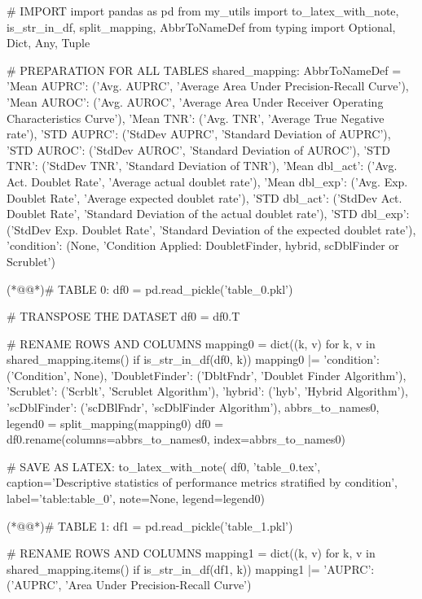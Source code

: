\documentclass[11pt]{article}
\begin{document}
\begin{python}

# IMPORT
import pandas as pd
from my_utils import to_latex_with_note, is_str_in_df, split_mapping, AbbrToNameDef
from typing import Optional, Dict, Any, Tuple 

# PREPARATION FOR ALL TABLES
shared_mapping: AbbrToNameDef = {
    'Mean AUPRC': ('Avg. AUPRC', 'Average Area Under Precision-Recall Curve'),
    'Mean AUROC': ('Avg. AUROC', 'Average Area Under Receiver Operating Characteristics Curve'),
    'Mean TNR': ('Avg. TNR', 'Average True Negative rate'),
    'STD AUPRC': ('StdDev AUPRC', 'Standard Deviation of AUPRC'),
    'STD AUROC': ('StdDev AUROC', 'Standard Deviation of AUROC'),
    'STD TNR': ('StdDev TNR', 'Standard Deviation of TNR'),
    'Mean dbl_act': ('Avg. Act. Doublet Rate', 'Average actual doublet rate'),
    'Mean dbl_exp': ('Avg. Exp. Doublet Rate', 'Average expected doublet rate'),
    'STD dbl_act': ('StdDev Act. Doublet Rate', 'Standard Deviation of the actual doublet rate'),
    'STD dbl_exp': ('StdDev Exp. Doublet Rate', 'Standard Deviation of the expected doublet rate'),
    'condition': (None, 'Condition Applied: DoubletFinder, hybrid, scDblFinder or Scrublet')
}

(*@@*)# TABLE 0:
df0 = pd.read_pickle('table_0.pkl')

# TRANSPOSE THE DATASET
df0 = df0.T

# RENAME ROWS AND COLUMNS
mapping0 = dict((k, v) for k, v in shared_mapping.items() if is_str_in_df(df0, k)) 
mapping0 |= {
    'condition': ('Condition', None),
    'DoubletFinder': ('DbltFndr', 'Doublet Finder Algorithm'),
    'Scrublet': ('Scrblt', 'Scrublet Algorithm'),
    'hybrid': ('hyb', 'Hybrid Algorithm'),
    'scDblFinder': ('scDBlFndr', 'scDblFinder Algorithm'),
}
abbrs_to_names0, legend0 = split_mapping(mapping0)
df0 = df0.rename(columns=abbrs_to_names0, index=abbrs_to_names0)

# SAVE AS LATEX:
to_latex_with_note(
    df0, 'table_0.tex',
    caption='Descriptive statistics of performance metrics stratified by condition', 
    label='table:table_0',
    note=None,
    legend=legend0)

(*@@*)# TABLE 1:
df1 = pd.read_pickle('table_1.pkl')

# RENAME ROWS AND COLUMNS
mapping1 = dict((k, v) for k, v in shared_mapping.items() if is_str_in_df(df1, k)) 
mapping1 |= {'AUPRC': ('AUPRC', 'Area Under Precision-Recall Curve')}


\end{python}
\end{document}
